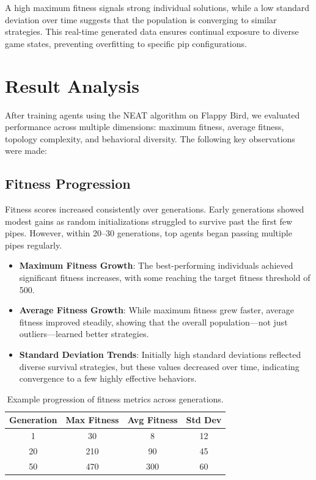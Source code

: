 \documentclass[sigconf]{acmart}
\begin{document}
A high maximum fitness signals strong individual solutions, while a low standard deviation over time suggests that the population is converging to similar strategies. This real-time generated data ensures continual exposure to diverse game states, preventing overfitting to specific pip configurations.



\section{Result Analysis}

After training agents using the NEAT algorithm on Flappy Bird, we evaluated performance across multiple dimensions: maximum fitness, average fitness, topology complexity, and behavioral diversity. The following key observations were made:

\subsection{Fitness Progression}
Fitness scores increased consistently over generations. Early generations showed modest gains as random initializations struggled to survive past the first few pipes. However, within 20--30 generations, top agents began passing multiple pipes regularly.

\begin{itemize}
    \item \textbf{Maximum Fitness Growth}: The best-performing individuals achieved significant fitness increases, with some reaching the target fitness threshold of 500.
    \item \textbf{Average Fitness Growth}: While maximum fitness grew faster, average fitness improved steadily, showing that the overall population---not just outliers---learned better strategies.
    \item \textbf{Standard Deviation Trends}: Initially high standard deviations reflected diverse survival strategies, but these values decreased over time, indicating convergence to a few highly effective behaviors.
\end{itemize}

\begin{table}[h]
\centering
\begin{tabular}{|c|c|c|c|}
\hline
\textbf{Generation} & \textbf{Max Fitness} & \textbf{Avg Fitness} & \textbf{Std Dev} \\ \hline
1 & 30 & 8 & 12 \\ \hline
20 & 210 & 90 & 45 \\ \hline
50 & 470 & 300 & 60 \\ \hline
\end{tabular}
\caption{Example progression of fitness metrics across generations.}
\end{table}
\end{document}
